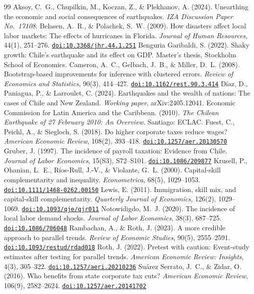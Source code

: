 \documentclass[12pt]{article}
\newcommand{\doi}[1]{\href{https://doi.org/#1}{\texttt{doi:#1}}}
\begin{document}

\begin{thebibliography}{99}
 Aksoy, C.~G., Chupilkin, M., Koczan, Z., \& Plekhanov, A.
(2024). Unearthing the economic and social consequences of earthquakes. \textit{IZA Discussion
Paper No.\ 17108}.
 Belasen, A.~R., \& Polachek, S.~W. (2009). How
disasters affect local labor markets: The effects of hurricanes in Florida. \textit{Journal of
Human Resources}, 44(1), 251--276. \doi{10.3368/jhr.44.1.251}
 Benguria Garibaldi, S. (2022). Shaky growth: Chile's
earthquake and its effect on GDP. Master's thesis, Stockholm School of Economics.
 Cameron, A.~C., Gelbach, J.~B., \& Miller, D.~L.
(2008). Bootstrap-based improvements for inference with clustered errors. \textit{Review of
Economics and Statistics}, 90(3), 414--427. \doi{10.1162/rest.90.3.414}
 D\'iaz, D., Paniagua, P., \& Larroulet, C. (2024).
Earthquakes and the wealth of nations: The cases of Chile and New Zealand. \textit{Working
paper}, arXiv:2405.12041.
 Economic Commission for Latin America and the Caribbean. (2010).
\textit{The Chilean Earthquake of 27 February 2010: An Overview}. Santiago: ECLAC.
 Fuest, C., Peichl, A., \& Siegloch, S. (2018). Do
higher corporate taxes reduce wages? \textit{American Economic Review}, 108(2), 393--418.
\doi{10.1257/aer.20130570}
 Gruber, J. (1997). The incidence of payroll taxation:
Evidence from Chile. \textit{Journal of Labor Economics}, 15(S3), S72--S101. \doi{10.1086/209877}
 Krusell, P., Ohanian, L.~E., R\'ios-Rull, J.-V.,
\& Violante, G.~L. (2000). Capital-skill complementarity and inequality.
\textit{Econometrica}, 68(5), 1029--1053. \doi{10.1111/1468-0262.00150}
 Lewis, E. (2011). Immigration, skill mix, and capital-skill
complementarity. \textit{Quarterly Journal of Economics}, 126(2), 1029--1069.
\doi{10.1093/qje/qjr011}
 Notowidigdo, M.~J. (2020). The incidence of local
labor demand shocks. \textit{Journal of Labor Economics}, 38(3), 687--725. \doi{10.1086/706048}
 Rambachan, A., \& Roth, J. (2023). A more
credible approach to parallel trends. \textit{Review of Economic Studies}, 90(5), 2555--2591.
\doi{10.1093/restud/rdad018}
 Roth, J. (2022). Pretest with caution: Event-study estimates
after testing for parallel trends. \textit{American Economic Review: Insights}, 4(3), 305--322.
\doi{10.1257/aeri.20210236}
 Su\'arez Serrato, J.~C., \& Zidar,
O. (2016). Who benefits from state corporate tax cuts? \textit{American Economic Review},
106(9), 2582--2624. \doi{10.1257/aer.20141702}
\end{thebibliography}
\end{document}
